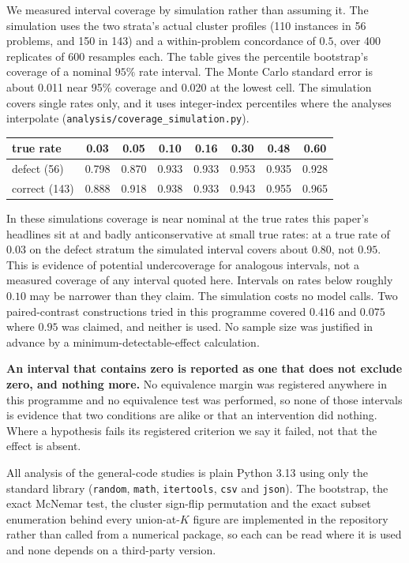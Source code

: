 We measured interval coverage by simulation rather than assuming it. The simulation uses the two
strata's actual cluster profiles (110 instances in 56 problems, and 150 in 143) and a
within-problem concordance of $0.5$, over 400 replicates of 600 resamples each. The table gives the
percentile bootstrap's coverage of a nominal $95\%$ rate interval. The Monte Carlo standard error
is about 0.011 near 95\% coverage and 0.020 at the lowest cell. The simulation covers single rates
only, and it uses integer-index percentiles where the analyses interpolate
(\texttt{analysis/coverage\_simulation.py}).

\begin{center}\small
\footnotesize\setlength{\tabcolsep}{2.5pt}
\begin{tabular}{@{}lccccccc@{}}
\toprule
true rate & 0.03 & 0.05 & 0.10 & 0.16 & 0.30 & 0.48 & 0.60 \\
\midrule
defect (56) & 0.798 & 0.870 & 0.933 & 0.933 & 0.953 & 0.935 & 0.928 \\
correct (143) & 0.888 & 0.918 & 0.938 & 0.933 & 0.943 & 0.955 & 0.965 \\
\bottomrule
\end{tabular}
\end{center}

\noindent In these simulations coverage is near nominal at the true rates this paper's headlines
sit at and badly anticonservative at small true rates: at a true rate of $0.03$ on the
defect stratum the simulated interval covers about $0.80$, not $0.95$. This is evidence of
potential undercoverage for analogous intervals, not a measured coverage of any interval quoted
here. Intervals on rates below roughly $0.10$ may be narrower than they claim. The simulation
costs no model calls. Two paired-contrast constructions tried in this programme covered $0.416$ and
$0.075$ where $0.95$ was claimed, and neither is used. No sample
size was justified in advance by a minimum-detectable-effect calculation.

\textbf{An interval that contains zero is reported as one that does not exclude zero, and nothing
more.} No equivalence margin was registered anywhere in this programme and no equivalence test was
performed, so none of those intervals is evidence that two conditions are alike or that an
intervention did nothing. Where a hypothesis fails its registered criterion we say it
failed, not that the effect is absent.

All analysis of the general-code studies is plain Python 3.13 using only the standard library (\texttt{random},
\texttt{math}, \texttt{itertools}, \texttt{csv} and \texttt{json}). The bootstrap, the exact
McNemar test, the cluster sign-flip permutation and the exact subset enumeration behind every
union-at-$K$ figure are implemented in the repository rather than called from a numerical package,
so each can be read where it is used and none depends on a third-party version.

